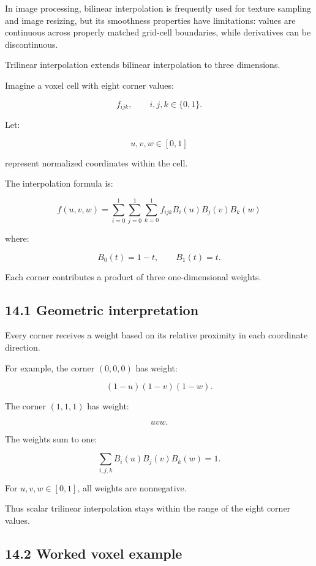 In image processing, bilinear interpolation is frequently used for texture sampling and image resizing, but its smoothness properties have limitations: values are continuous across properly matched grid-cell boundaries, while derivatives can be discontinuous.

Trilinear interpolation extends bilinear interpolation to three dimensions.

Imagine a voxel cell with eight corner values:

\[ f_{ijk}, \qquad i,j,k\in\{0,1\}. \]

Let:

\[ u,v,w\in[0,1] \]

represent normalized coordinates within the cell.

The interpolation formula is:

\[ \boxed{ f(u,v,w)= \sum_{i=0}^{1} \sum_{j=0}^{1} \sum_{k=0}^{1} f_{ijk} B_i(u)B_j(v)B_k(w) } \]

where:

\[ B_0(t)=1-t, \qquad B_1(t)=t. \]

Each corner contributes a product of three one-dimensional weights.

\subsection{14.1 Geometric interpretation}\label{02-foundations-ii-ch028-geometric-interpretation}

Every corner receives a weight based on its relative proximity in each coordinate direction.

For example, the corner \((0,0,0)\) has weight:

\[ (1-u)(1-v)(1-w). \]

The corner \((1,1,1)\) has weight:

\[ uvw. \]

The weights sum to one:

\[ \sum_{i,j,k}B_i(u)B_j(v)B_k(w)=1. \]

For \(u,v,w\in[0,1]\), all weights are nonnegative.

Thus scalar trilinear interpolation stays within the range of the eight corner values.

\subsection{14.2 Worked voxel example}\label{02-foundations-ii-ch028-worked-voxel-example}

